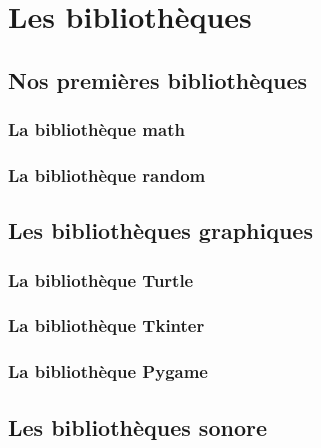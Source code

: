 \part{Les bibliothèques}

\chapter{Nos premières bibliothèques}

\section*{La bibliothèque math}

\section*{La bibliothèque random}

\chapter{Les bibliothèques graphiques}

\section*{La bibliothèque Turtle}

\section*{La bibliothèque Tkinter}

\section*{La bibliothèque Pygame}

\chapter{Les bibliothèques sonore}
